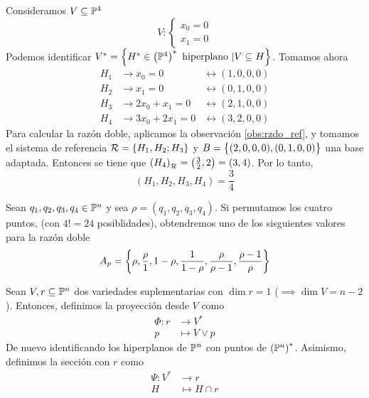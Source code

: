 \begin{example}
 Consideramos $V \subseteq \mathbb{P}^4$
 \[
  V : \begin{cases}
       x_0 = 0 \\ x_1 = 0
      \end{cases}
 \]
 Podemos identificar $V^* = \left\{H^* \in \left( \mathbb{P}^4 \right)^* \text{ hiperplano } \vert V \subseteq H\right\}$.
 Tomamos ahora
 \[
  \begin{aligned}
   H_1 &\rightarrow x_0 = 0 &\leftrightarrow (1,0,0,0) \\
   H_2 &\rightarrow x_1 = 0 &\leftrightarrow (0,1,0,0) \\
   H_3 &\rightarrow 2x_0+x_1 = 0 &\leftrightarrow (2,1,0,0) \\
   H_4 &\rightarrow 3x_0+2x_1 = 0 &\leftrightarrow (3,2,0,0)
  \end{aligned}
 \]
 Para calcular la razón doble, aplicamos la observación \ref{obs:rzdo_ref}, y tomamos el sistema
 de referencia $\mathcal{R} = \left\{H_1,H_2;H_3\right\}$ y $B = \left\{(2,0,0,0),(0,1,0,0)\right\}$ una base adaptada.
 Entonces se tiene que $\left( H_4 \right)_{\mathcal{R}} = \left( \frac{3}{2}, 2 \right) = (3,4)$. Por lo
 tanto,
 \[
  (H_1,H_2,H_3,H_4) = \frac{3}{4}
 \]
\end{example}

\begin{prop}
    Sean $q_1,q_2,q_3,q_4 \in \mathbb{P}^n$ y sea $\rho = (q_1,q_2,q_3,q_4)$. Si permutamos los cuatro
    puntos, (con $4! = 24$ posiblidades), obtendremos uno de los sisguientes valores para la
    razón doble
    \[
        A_p = \left\{\rho, \frac{\rho}{1}, 1-\rho, \frac{1}{1-\rho}, \frac{\rho}{\rho-1}, \frac{\rho-1}{\rho}\right\}
    \]

\end{prop}

\begin{defi}[proyección]
 Sean $V,r \subseteq \mathbb{P}^n$ dos variedades suplementarias con $\dim r = 1$ ($\implies \dim V = n-2$).
 Entonces, definimos la proyección desde $V$ como
 \[
  \begin{aligned}
   \Phi \colon r &\to V^* \\ p &\mapsto V \vee p
  \end{aligned}
 \]
 De nuevo identificando los hiperplanos de $\mathbb{P}^n$ con puntos de $\left( \mathbb{P}^n \right)^*$. Asimismo,
 definimos la sección con $r$ como
 \[
  \begin{aligned}
   \Psi \colon V^* &\to r \\ H &\mapsto H \cap r
  \end{aligned}
 \]
\end{defi}


